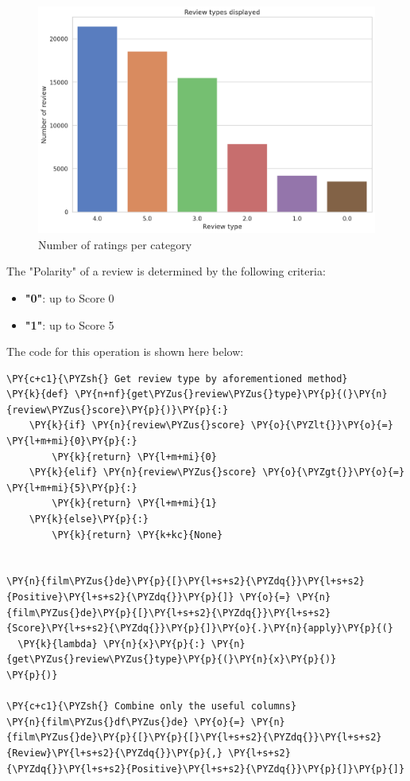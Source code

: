 \begin{figure}[H]
\centering
\includegraphics[width=1\textwidth]{images/output_37_1.png}
\caption{Number of ratings per category}
\label{fig:fig_03}
\end{figure}
\FloatBarrier


The "Polarity" of a review is determined by the following criteria:
\begin{itemize}
\item \textbf{"0"}: up to Score 0
\item \textbf{"1"}: up to Score 5
\end{itemize}
The code for this operation is shown here below:

        \begin{tcolorbox}[breakable, size=fbox, boxrule=1pt, pad at break*=1mm,colback=cellbackground, colframe=cellborder]
\begin{Verbatim}[commandchars=\\\{\},fontsize=\footnotesize]
\PY{c+c1}{\PYZsh{} Get review type by aforementioned method}
\PY{k}{def} \PY{n+nf}{get\PYZus{}review\PYZus{}type}\PY{p}{(}\PY{n}{review\PYZus{}score}\PY{p}{)}\PY{p}{:}
    \PY{k}{if} \PY{n}{review\PYZus{}score} \PY{o}{\PYZlt{}}\PY{o}{=} \PY{l+m+mi}{0}\PY{p}{:}
        \PY{k}{return} \PY{l+m+mi}{0}
    \PY{k}{elif} \PY{n}{review\PYZus{}score} \PY{o}{\PYZgt{}}\PY{o}{=} \PY{l+m+mi}{5}\PY{p}{:}
        \PY{k}{return} \PY{l+m+mi}{1}
    \PY{k}{else}\PY{p}{:}
        \PY{k}{return} \PY{k+kc}{None}


\PY{n}{film\PYZus{}de}\PY{p}{[}\PY{l+s+s2}{\PYZdq{}}\PY{l+s+s2}{Positive}\PY{l+s+s2}{\PYZdq{}}\PY{p}{]} \PY{o}{=} \PY{n}{film\PYZus{}de}\PY{p}{[}\PY{l+s+s2}{\PYZdq{}}\PY{l+s+s2}{Score}\PY{l+s+s2}{\PYZdq{}}\PY{p}{]}\PY{o}{.}\PY{n}{apply}\PY{p}{(}
  \PY{k}{lambda} \PY{n}{x}\PY{p}{:} \PY{n}{get\PYZus{}review\PYZus{}type}\PY{p}{(}\PY{n}{x}\PY{p}{)}
\PY{p}{)}

\PY{c+c1}{\PYZsh{} Combine only the useful columns}
\PY{n}{film\PYZus{}df\PYZus{}de} \PY{o}{=} \PY{n}{film\PYZus{}de}\PY{p}{[}\PY{p}{[}\PY{l+s+s2}{\PYZdq{}}\PY{l+s+s2}{Review}\PY{l+s+s2}{\PYZdq{}}\PY{p}{,} \PY{l+s+s2}{\PYZdq{}}\PY{l+s+s2}{Positive}\PY{l+s+s2}{\PYZdq{}}\PY{p}{]}\PY{p}{]}
\end{Verbatim}
\end{tcolorbox}

